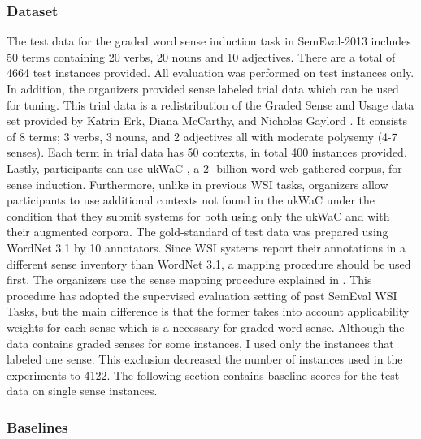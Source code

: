 
\subsubsection{Dataset} 


The test data for the graded word sense induction task in SemEval-2013 includes 50 terms containing 20 verbs, 20 nouns and 10 adjectives. There are a total of 4664 test instances provided. All evaluation was performed on test instances only. In addition, the organizers provided sense labeled trial data which can be used for tuning. This trial data is a redistribution of the Graded Sense and Usage data set provided by Katrin Erk, Diana McCarthy, and Nicholas Gaylord \cite{erk09graded}. It consists of 8 terms; 3 verbs, 3 nouns, and 2 adjectives all with moderate polysemy (4-7 senses). Each term in trial data has 50 contexts, in total 400 instances provided. Lastly, participants can use ukWaC \cite{ukWaC}, a 2- billion word web-gathered corpus, for sense induction. Furthermore, unlike in previous WSI tasks, organizers allow participants to use additional contexts not found in the ukWaC under the condition that they submit systems for both using only the ukWaC and with their augmented corpora. The gold-standard of test data was prepared using WordNet 3.1 by 10 annotators. Since WSI systems report their annotations in a different sense inventory than WordNet 3.1, a mapping procedure should be used first. The organizers use the sense mapping procedure explained in \cite{jurgens12evaluation}. This procedure has adopted the supervised evaluation setting of past SemEval WSI Tasks, but the main difference is that the former takes into account applicability weights for each sense which is a necessary for graded word sense. Although the data contains graded senses for some instances, I used only the instances that labeled one sense. This exclusion decreased the number of instances used in the experiments to 4122. The following section contains baseline scores for the test data on single sense instances.




\subsubsection{Baselines}

